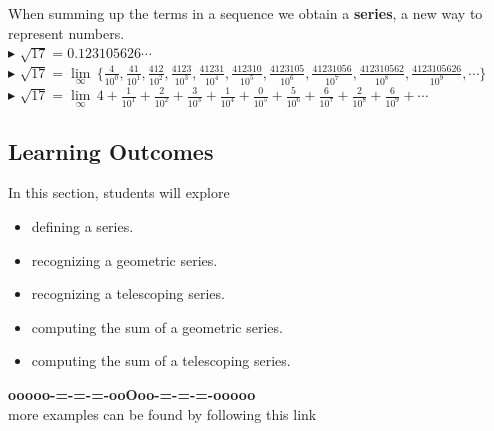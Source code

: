 \documentclass{ximera}
\begin{document}
When summing up the terms in a sequence we obtain a \textbf{series}, a new way to represent numbers. \\


$\blacktriangleright$  $\sqrt{17} = 0.123105626\cdots$ \\



$\blacktriangleright$ $\sqrt{17} =  \lim\limits_{\infty} \, \{ \frac{4}{10^0}, \frac{41}{10^1},  \frac{412}{10^2}, \frac{4123}{10^3}, \frac{41231}{10^4}, \frac{412310}{10^5}, \frac{4123105}{10^6}, \frac{41231056}{10^7}, \frac{412310562}{10^8}, \frac{4123105626}{10^9}, \cdots \}$ \\



$\blacktriangleright$ $\sqrt{17} = \lim\limits_{\infty} \, 4 + \frac{1}{10^1} + \frac{2}{10^2} + \frac{3}{10^3} + \frac{1}{10^4} + \frac{0}{10^5} + \frac{5}{10^6} + \frac{6}{10^7} + \frac{2}{10^8} + \frac{6}{10^9} + \cdots$ \\











\subsection*{Learning Outcomes}








\begin{sectionOutcomes}

In this section, students will explore

\begin{itemize}
\item defining a series.
\item recognizing a geometric series.
\item recognizing a telescoping series.
\item computing the sum of a geometric series.
\item computing the sum of a telescoping series.
\end{itemize}

\end{sectionOutcomes}












\begin{center}
\textbf{\textcolor{green!50!black}{ooooo-=-=-=-ooOoo-=-=-=-ooooo}} \\

more examples can be found by following this link\\ 

\end{center}
\end{document}

